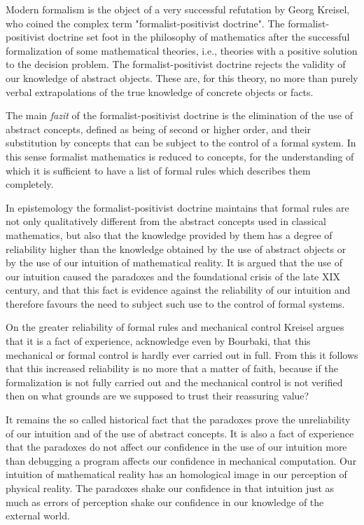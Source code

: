 \documentclass[12pt]{article}
\begin{document}
Modern formalism is the object of a very successful refutation by Georg Kreisel, who coined the complex term "formalist-positivist doctrine". The formalist-positivist doctrine set foot in the philosophy of mathematics after the successful  formalization of some mathematical theories, i.e., theories with a positive solution to the decision problem. The formalist-positivist doctrine rejects the validity of our knowledge of abstract objects. These are, for this theory, no more than purely verbal extrapolations of the true knowledge of concrete objects or facts.

The main \emph{fazit} of the formalist-positivist doctrine is the elimination of the use of abstract concepts, defined as being of second or higher order, and their substitution by concepts that can be subject to the control of a formal system. In this sense formalist mathematics is reduced to concepts, for the understanding of which it is sufficient to have a list of formal rules which describes them completely.

In epistemology the formalist-positivist doctrine maintains that formal rules are not only qualitatively different from the abstract concepts used in classical mathematics, but also that the knowledge provided by them has a degree of reliability higher than the knowledge obtained by the use of abstract objects or by the use of our intuition of   mathematical reality. It is argued that the use of our intuition caused the paradoxes and the foundational crisis of the late XIX century, and that this fact is evidence against the reliability of our intuition and therefore favours the need to subject such use to the control of formal systems.

On the greater reliability of formal rules and mechanical control Kreisel argues that it is a fact of experience, acknowledge even by Bourbaki, that this mechanical or formal control is hardly ever carried out in full. From this it follows that this increased reliability is no more that a matter of faith, because if the formalization is not fully carried out and the mechanical control is not verified then on what grounds are we supposed to trust their reassuring  value?

It remains the so called historical fact that the paradoxes prove the unreliability of our intuition and of the use of abstract concepts. It is also a fact of experience that the paradoxes do not affect our confidence in the use of our  intuition more than debugging a program affects our confidence in mechanical computation. Our intuition of mathematical reality has an homological image in our perception of physical reality. The paradoxes shake our confidence in that intuition just as much as errors of perception shake our confidence in our knowledge of the external world.
\end{document}
